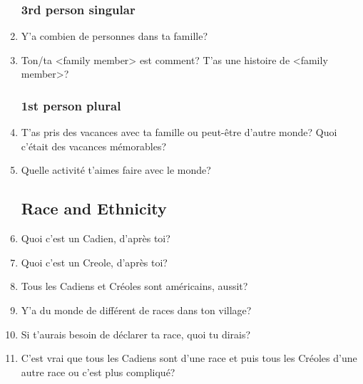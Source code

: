 \begin{enumerate}
    \subsubsection{3rd person singular}
      \item Y'a combien de personnes dans ta famille?\\
      \item Ton/ta <family member> est comment? T'as une histoire de <family member>?
    \subsubsection{1st person plural}
      \item T'as pris des vacances avec ta famille ou peut-être d'autre monde? Quoi c'était des vacances mémorables?
      \item Quelle activité t'aimes faire avec le monde?
  \subsection{Race and Ethnicity}
    \item Quoi c'est un Cadien, d'après toi?
    \item Quoi c'est un Creole, d'après toi?
    \item Tous les Cadiens et Créoles sont américains, aussit?
    \item Y'a du monde de différent de races dans ton village?
    \item Si t'aurais besoin de déclarer ta race, quoi tu dirais?
    \item C'est vrai que tous les Cadiens sont d'une race et puis tous les Créoles d'une autre race ou c'est plus compliqué?

\end{enumerate}
